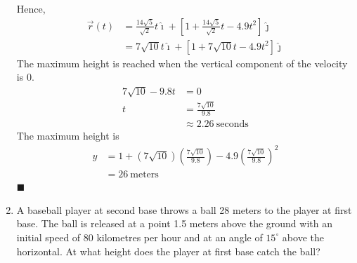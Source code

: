 \documentclass{report}
\begin{document}
\begin{enumerate}
          Hence,
          \begin{align*}
              \vec{r}(t) & = \frac{14\sqrt{5}}{\sqrt{2}} t\hat{\imath} + \left[1 + \frac{14\sqrt{5}}{\sqrt{2}} t - 4.9t^2\right]\hat{\jmath} \\
                         & = 7\sqrt{10} t\hat{\imath} + \left[1 + 7\sqrt{10} t - 4.9t^2\right]\hat{\jmath}
          \end{align*}
          The maximum height is reached when the vertical component of the velocity is $0$.
          \begin{align*}
              7\sqrt{10} - 9.8t & = 0                          \\
              t                 & = \frac{7\sqrt{10}}{9.8}     \\
                                & \approx 2.26\ \text{seconds}
          \end{align*}
          The maximum height is
          \begin{align*}
              y & = 1 + (7\sqrt{10})\left(\frac{7\sqrt{10}}{9.8}\right) - 4.9\left(\frac{7\sqrt{10}}{9.8}\right)^2 \\
                & = 26\ \text{meters}
          \end{align*} \hfill$\blacksquare$

    \item A baseball player at second base throws a ball 28 meters to the player at first
          base. The ball is released at a point 1.5 meters above the ground with an
          initial speed of 80 kilometres per hour and at an angle of $15^{\circ}$ above
          the horizontal. At what height does the player at first base catch the ball?


\end{enumerate}
\end{document}
